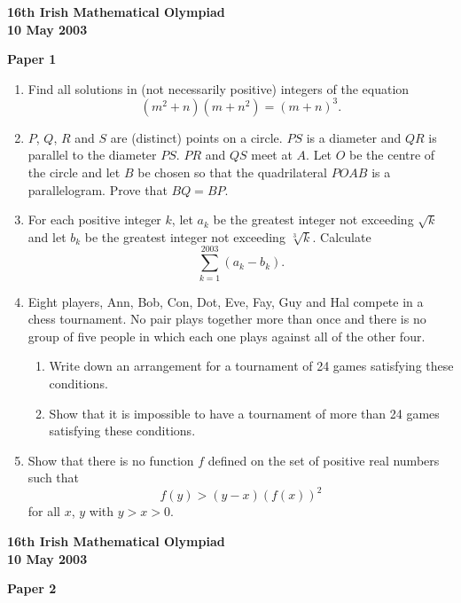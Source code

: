 \documentclass[12pt]{article}
\begin{document}
\begin{center}
{\large\bfseries 16th Irish Mathematical Olympiad\\10 May 2003}
\end{center}
\bigskip\noindent\textbf{Paper 1}\bigskip
\begin{enumerate}
\item Find all solutions in (not necessarily positive) integers of the equation
\[
(m^2 + n)(m + n^2) = (m + n)^3.
\]

\item $P$, $Q$, $R$ and $S$ are (distinct) points on a circle. $PS$ is a diameter and $QR$ is parallel to the diameter $PS$. $PR$ and $QS$ meet at $A$. Let $O$ be the centre of the circle and let $B$ be chosen so that the quadrilateral $POAB$ is a parallelogram. Prove that $BQ = BP$.

\item For each positive integer $k$, let $a_k$ be the greatest integer not exceeding $\sqrt{k}$ and let $b_k$ be the greatest integer not exceeding $\sqrt[3]{k}$. Calculate
\[
\sum_{k=1}^{2003} (a_k - b_k).
\]

\item Eight players, Ann, Bob, Con, Dot, Eve, Fay, Guy and Hal compete in a chess tournament. No pair plays together more than once and there is no group of five people in which each one plays against all of the other four.
\begin{enumerate}
\item[(a)] Write down an arrangement for a tournament of 24 games satisfying these conditions.
\item[(b)] Show that it is impossible to have a tournament of more than 24 games satisfying these conditions.
\end{enumerate}

\item Show that there is no function $f$ defined on the set of positive real numbers such that
\[
f(y) > (y - x)(f(x))^2
\]
for all $x$, $y$ with $y > x > 0$.

\end{enumerate}
\newpage
\begin{center}
{\large\bfseries 16th Irish Mathematical Olympiad\\10 May 2003}
\end{center}
\bigskip\noindent\textbf{Paper 2}\bigskip
\end{document}
